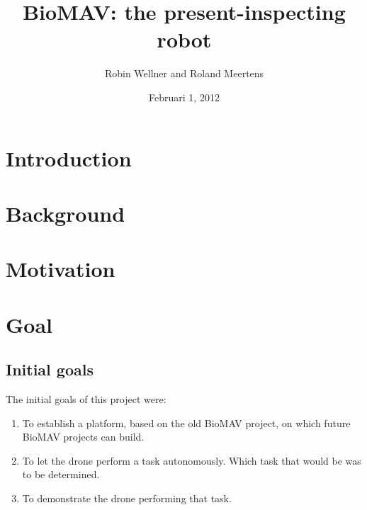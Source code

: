 \documentclass[a4paper,10pt]{article}
\begin{document}
\title{BioMAV: the present-inspecting robot}

\author{Robin Wellner and Roland Meertens}

\date{Februari 1, 2012}

\maketitle


\section{Introduction}

\section{Background}


\section{Motivation}

\section{Goal}
\subsection{Initial goals}
The initial goals of this project were:
\begin{enumerate}
\item To establish a platform, based on the old BioMAV project, on which
      future BioMAV projects can build.
\item To let the drone perform a task autonomously. Which task that would be
      was to be determined.
\item To demonstrate the drone performing that task.
\end{enumerate}
\end{document}
